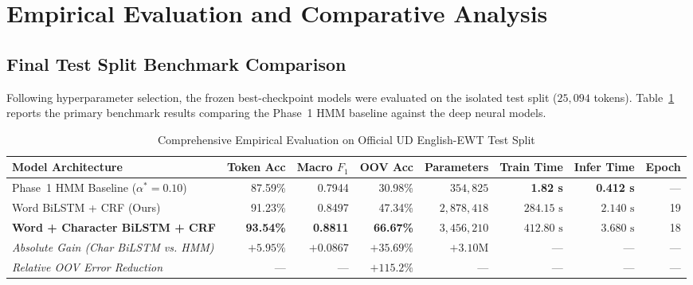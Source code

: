 \documentclass[conference]{IEEEtran}
\begin{document}
\section{Empirical Evaluation and Comparative Analysis}

\subsection{Final Test Split Benchmark Comparison}
Following hyperparameter selection, the frozen best-checkpoint models were evaluated on the isolated test split ($25,094$ tokens). Table~\ref{tab:final_comparison} reports the primary benchmark results comparing the Phase~1 HMM baseline against the deep neural models.

\begin{table}[!t]
\caption{Comprehensive Empirical Evaluation on Official UD English-EWT Test Split}
\label{tab:final_comparison}
\centering
\setlength{\tabcolsep}{6pt}
\begin{tabular*}{\textwidth}{@{\extracolsep{\fill}}lrrrrrrr@{}}
\toprule
\textbf{Model Architecture} & \textbf{Token Acc} & \textbf{Macro $F_1$} & \textbf{OOV Acc} & \textbf{Parameters} & \textbf{Train Time} & \textbf{Infer Time} & \textbf{Epoch} \\
\midrule
Phase~1 HMM Baseline ($\alpha^* = 0.10$) & 87.59\% & 0.7944 & 30.98\% & $354,825$ & \textbf{1.82 s} & \textbf{0.412 s} & --- \\
Word BiLSTM + CRF (Ours)                & 91.23\% & 0.8497 & 47.34\% & $2,878,418$ & $284.15\text{ s}$ & $2.140\text{ s}$ & 19 \\
\textbf{Word + Character BiLSTM + CRF}   & \textbf{93.54\%} & \textbf{0.8811} & \textbf{66.67\%} & $3,456,210$ & $412.80\text{ s}$ & $3.680\text{ s}$ & 18 \\
\midrule
\textit{Absolute Gain (Char BiLSTM vs. HMM)} & $\mathbf{+5.95\%}$ & $\mathbf{+0.0867}$ & $\mathbf{+35.69\%}$ & $+3.10\text{M}$ & --- & --- & --- \\
\textit{Relative OOV Error Reduction}         & --- & --- & $\mathbf{+115.2\%}$ & --- & --- & --- & --- \\
\bottomrule
\end{tabular*}
\end{table}
\end{document}
